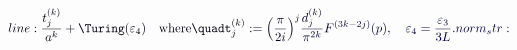 \documentclass[12pt]{article}
\begin{document}
\makeatletter
\renewcommand*{\@textcolor}[3]{%
  \protect\leavevmode
  \begingroup
    \color#1{#2}#3%
  \endgroup
}
\makeatother
\begin{displaymath}
\mathcolor[RGB]{0,0,15}{line:
\frac{t^{(k)}_j}{a^k}+\Turing(\varepsilon_4)\quad\text{where}\quadt^{(k)}_j} \mathcolor[RGB]{0,0,30}{:=\Bigl(\frac{\pi}{2i}\Bigr)^j} \mathcolor[RGB]{0,0,45}{\frac{d^{(k)}_j}{\pi^{2k}}F^{(3k-2j)}(p),} \mathcolor[RGB]{0,0,60}{\quad\varepsilon_4=\frac{\varepsilon_3}{3L}.

norm_str:}
\end{displaymath}
\end{document}
